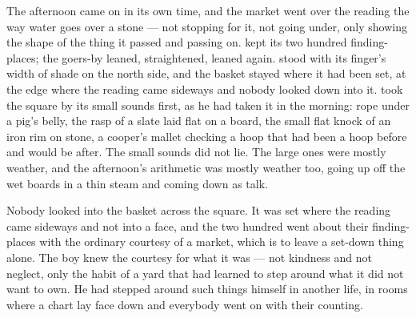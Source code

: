 The afternoon came on in its own time, and the market went over the reading the way water goes over a stone --- not stopping for it, not going under, only showing the shape of the thing it passed and passing on.  kept its two hundred finding-places; the goers-by leaned, straightened, leaned again.  stood with its finger's width of shade on the north side, and the basket stayed where it had been set, at the edge where the reading came sideways and nobody looked down into it.  took the square by its small sounds first, as he had taken it in the morning: rope under a pig's belly, the rasp of a slate laid flat on a board, the small flat knock of an iron rim on stone, a cooper's mallet checking a hoop that had been a hoop before and would be after. The small sounds did not lie. The large ones were mostly weather, and the afternoon's arithmetic was mostly weather too, going up off the wet boards in a thin steam and coming down as talk.

Nobody looked into the basket across the square. It was set where the reading came sideways and not into a face, and the two hundred went about their finding-places with the ordinary courtesy of a market, which is to leave a set-down thing alone. The boy knew the courtesy for what it was --- not kindness and not neglect, only the habit of a yard that had learned to step around what it did not want to own. He had stepped around such things himself in another life, in rooms where a chart lay face down and everybody went on with their counting.

